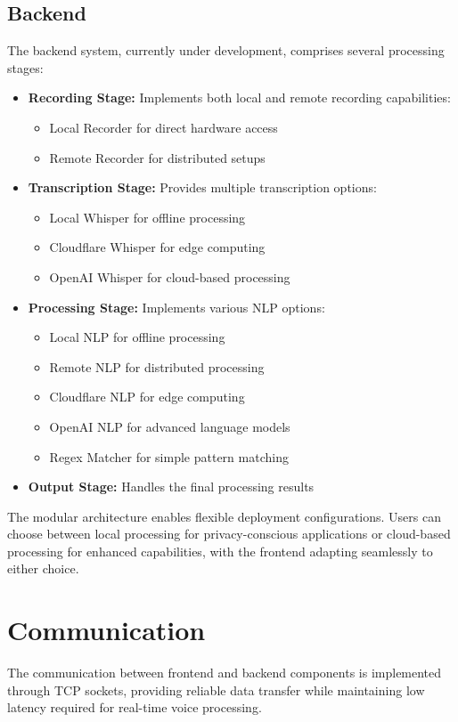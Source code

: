 \subsection{Backend}
The backend system, currently under development, comprises several processing stages:
\begin{itemize}
    \item \textbf{Recording Stage:} Implements both local and remote recording capabilities:
    \begin{itemize}
        \item Local Recorder for direct hardware access
        \item Remote Recorder for distributed setups
    \end{itemize}
    \item \textbf{Transcription Stage:} Provides multiple transcription options:
    \begin{itemize}
        \item Local Whisper for offline processing
        \item Cloudflare Whisper for edge computing
        \item OpenAI Whisper for cloud-based processing
    \end{itemize}
    \item \textbf{Processing Stage:} Implements various NLP options:
    \begin{itemize}
        \item Local NLP for offline processing
        \item Remote NLP for distributed processing
        \item Cloudflare NLP for edge computing
        \item OpenAI NLP for advanced language models
        \item Regex Matcher for simple pattern matching
    \end{itemize}
    \item \textbf{Output Stage:} Handles the final processing results
\end{itemize}

The modular architecture enables flexible deployment configurations. Users can choose between local processing for privacy-conscious applications or cloud-based processing for enhanced capabilities, with the frontend adapting seamlessly to either choice.

\section{Communication}
The communication between frontend and backend components is implemented through TCP sockets, providing reliable data transfer while maintaining low latency required for real-time voice processing.

